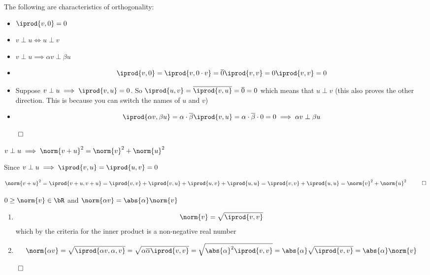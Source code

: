 \documentclass[10pt]{article}
\begin{document}
\newpage
\begin{lemma*}{The following are characteristics of orthogonality:
\begin{itemize}
    \item $\iprod{v,0}=0$
    \item $v\perp u\iff u\perp v$
    \item $v\perp u\implies \alpha v\perp\beta u$
\end{itemize}}

\begin{itemize}
    \item \[ \iprod{v,0} = \iprod{v,0\cdot v} = \overline{0}\iprod{v,v} = 0\iprod{v,v} = 0 \]
    \item Suppose $v\perp u\implies\iprod{v,u}=0$. So $\iprod{u,v}=\overline{\iprod{v,u}}=\overline{0}=0$ which means that $u\perp v$ (this also proves the other direction. This is because you can switch the names of $u$ and $v$)
    \item \[ \iprod{\alpha v,\beta u} = \alpha\cdot\overline{\beta}\iprod{v,u}=\alpha\cdot\overline{\beta}\cdot0=0 \implies \alpha v\perp\beta u \]
\end{itemize} 

$\qed$

\end{lemma*}

\begin{lemma}[pythagLemma]{$v\perp u\implies \norm{v+u}^2=\norm{v}^2+\norm{u}^2$}

Since $v\perp u\implies\iprod{v,u}=\iprod{u,v}=0$

\[ \norm{v+u}^2 = \iprod{v+u,v+u} = \iprod{v,v}+\iprod{v,u}+\iprod{u,v}+\iprod{u,u} = \iprod{v,v}+\iprod{u,u} = \norm{v}^2+\norm{u}^2 ~~ \qed \]

\end{lemma}

\begin{lemma}[normFirstCriteriaLemma]{$0\geq\norm{v}\in\bR$ and $\norm{\alpha v}=\abs{\alpha}\norm{v}$}
    
\begin{enumerate}
    \item 
    \[ \norm{v}=\sqrt{\iprod{v,v}}\]
    which by the criteria for the inner product is a non-negative real number
    
    \item  
    \[ \norm{\alpha v} = \sqrt{\iprod{\alpha v, \alpha, v}} = \sqrt{\alpha\overline{\alpha}\iprod{v,v}}=\sqrt{\abs{\alpha}^2\iprod{v,v}} = \abs{\alpha}\sqrt{\iprod{v,v}}=\abs{\alpha}\norm{v} \]
\end{enumerate}

$\qed$

\end{lemma}
\end{document}
